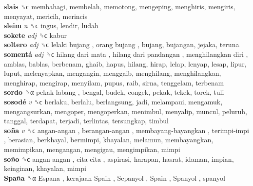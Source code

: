 \textbf{slais} ␝ϲ  membahagi, membelah, memotong, mengeping, menghiris, mengiris, menyayat, mericih, merincis  \\
\textbf{sleim} \emph{n}  ␝ϲ  ingus, lendir, ludah  \\
\textbf{sokete} \emph{adj}  ␝ϲ  kabur  \\
\textbf{soltero} \emph{adj}  ␝ϲ   lelaki bujang ,  orang bujang , bujang, bujangan, jejaka, teruna  \\
\textbf{somentá} \emph{adj}  ␝ϲ   hilang dari mata ,  hilang dari pandangan ,  menghilangkan diri , amblas, bablas, berbenam, ghaib, hapus, hilang, hirap, lelap, lenyap, lesap, lipur, luput, melenyapkan, mengangin, menggaib, menghilang, menghilangkan, menghirap, mengirap, menyilam, pupus, raib, sirna, tenggelam, terbenam  \\
\textbf{sordo} ␝α   pekak labang , bengal, budek, congek, pekak, tekek, torek, tuli  \\
\textbf{sosodé} \emph{v}  ␝ϲ  berlaku, berlalu, berlangsung, jadi, melampaui, mengamuk, mengangsurkan, mengoper, mengoperkan, menimbul, menyalip, muncul, peluruh, tanggal, terdapat, terjadi, terlintas, tersungkap, timbul  \\
\textbf{soña} \emph{v}  ␝ϲ   angan-angan ,  berangan-angan ,  membayang-bayangkan ,  terimpi-impi , berasian, berkhayal, bermimpi, khayalan, melamun, membayangkan, memimpikan, mengangan, mengigau, mengimpikan, mimpi  \\
\textbf{soño} ␝ϲ   angan-angan ,  cita-cita , aspirasi, harapan, hasrat, idaman, impian, keinginan, khayalan, mimpi  \\
\textbf{Spaña} ␝α   Espana ,  kerajaan Spain ,  Sepanyol ,  Spain ,  Spanyol , spanyol  \\
